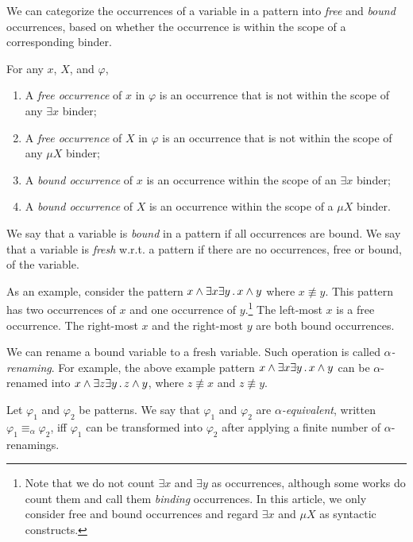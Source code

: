 \documentclass{article}
\begin{document}
We can categorize the occurrences of a variable in a pattern
into \emph{free} and \emph{bound} occurrences,
based on whether the occurrence is within the scope
of a corresponding binder. 

\begin{definition}
For any $x$, $X$, and $\varphi$,
\begin{enumerate}
\item A \emph{free occurrence} of $x$ in $\varphi$ 
      is an occurrence that is not within the scope of any $\exists x$ binder;
\item A \emph{free occurrence} of $X$ in $\varphi$
      is an occurrence that is not within the scope of any $\mu X$ binder;
\item A \emph{bound occurrence} of $x$ is an occurrence
      within the scope of an $\exists x$ binder;
\item A \emph{bound occurrence} of $X$ is an occurrence
      within the scope of a $\mu X$ binder.
\end{enumerate}
We say that a variable is \emph{bound} in a pattern if 
all occurrences are bound. 
We say that a variable is \emph{fresh} w.r.t. a pattern if
there are no occurrences, free or bound, of the variable. 
\end{definition}

As an example, consider the pattern
$x \land \exists x \exists y \,.\, x \land y$
where $x \not\equiv y$. 
This pattern 
has two occurrences of $x$ and one occurrence of $y$.\footnote{Note that we do not count $\exists x$ and $\exists y$ as occurrences, although some works do count them and call them \emph{binding} occurrences. In this article, we only consider free and bound occurrences and regard
$\exists x$ and $\mu X$ as syntactic constructs.}
The left-most $x$ is a free occurrence.
The right-most $x$ and the right-most $y$ are both bound occurrences. 

We can rename a bound variable to a fresh variable. 
Such operation is called \emph{$\alpha$-renaming}. 
For example, the above example pattern 
$x \land \exists x \exists y \,.\, x \land y$
can be $\alpha$-renamed into
$x \land \exists z \exists y \,.\, z \land y$, 
where $z \not\equiv x$ and $z \not\equiv y$. 

\begin{definition}
Let $\varphi_1$ and $\varphi_2$ be patterns. 
We say that $\varphi_1$ and $\varphi_2$
are \emph{$\alpha$-equivalent}, written $\varphi_1 \equiv_\alpha \varphi_2$,
iff $\varphi_1$ can be transformed into $\varphi_2$ after applying
a finite number of $\alpha$-renamings. 
\end{definition}
\end{document}
